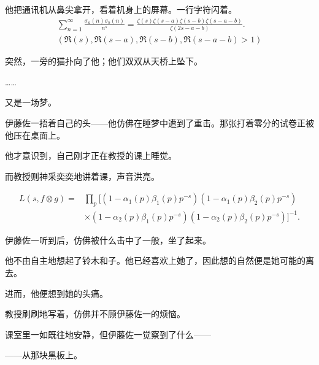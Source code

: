 他把通讯机从鼻尖拿开，看着机身上的屏幕。一行字符闪着。
\begin{gather*}
\sum_{n=1}^{\infty}\frac{\sigma_a(n)\sigma_b(n)}{n^s}=\frac{\zeta(s)\zeta(s-a)\zeta(s-b)\zeta(s-a-b)}{\zeta(2s-a-b)}.  \\
(\Re(s),\Re(s-a),\Re(s-b),\Re(s-a-b)>1)
\end{gather*}

突然，一旁的猫扑向了他；他们双双从天桥上坠下。

……

又是一场梦。

伊藤佐一捂着自己的头——他仿佛在睡梦中遭到了重击。那张打着零分的试卷正被他压在桌面上。

他才意识到，自己刚才正在教授的课上睡觉。

而教授则神采奕奕地讲着课，声音洪亮。

\begin{align*}
L(s,f\otimes g)=&\prod_{p}[(1-\alpha_1(p)\beta_1(p)p^{-s})(1-\alpha_1(p)\beta_2(p)p^{-s})\\
&\times(1-\alpha_2(p)\beta_1(p)p^{-s})(1-\alpha_2(p)\beta_2(p)p^{-s})]^{-1}.
\end{align*}


伊藤佐一听到后，仿佛被什么击中了一般，坐了起来。


他不由自主地想起了铃木和子。他已经喜欢上她了，因此想的自然便是她可能的离去。

进而，他便想到她的头痛。


教授刷刷地写着，仿佛并不顾伊藤佐一的烦恼。

课室里一如既往地安静，但伊藤佐一觉察到了什么——

——从那块黑板上。

